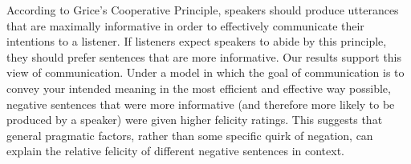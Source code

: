 \documentclass[10pt,letterpaper]{article}
\begin{document}
According to Grice's Cooperative Principle, speakers should produce utterances that are maximally informative in order to effectively communicate their intentions to a listener.  If listeners expect speakers to abide by this principle, they should prefer sentences that are more informative.  Our results support this view of communication.  Under a model in which the goal of communication is to convey your intended meaning in the most efficient and effective way possible, negative sentences that were more informative (and therefore more likely to be produced by a speaker) were given higher felicity ratings.  This suggests that general pragmatic factors, rather than some specific quirk of negation, can explain the relative felicity of different negative sentences in context.  










 
 




\end{document}

